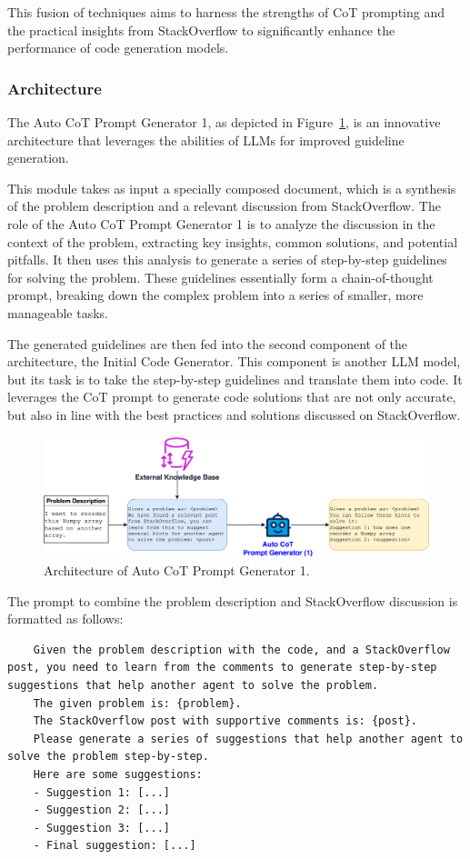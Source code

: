 \documentclass[a4paper,oneside]{book}
\begin{document}
This fusion of techniques aims to harness the strengths of CoT prompting and the practical insights from StackOverflow to significantly enhance the performance of code generation models.

\subsubsection{Architecture}
The Auto CoT Prompt Generator 1, as depicted in Figure~\ref{fig:cot_generator_1}, is an innovative architecture that leverages the abilities of LLMs for improved guideline generation.

This module takes as input a specially composed document, which is a synthesis of the problem description and a relevant discussion from StackOverflow. The role of the Auto CoT Prompt Generator 1 is to analyze the discussion in the context of the problem, extracting key insights, common solutions, and potential pitfalls. It then uses this analysis to generate a series of step-by-step guidelines for solving the problem. These guidelines essentially form a chain-of-thought prompt, breaking down the complex problem into a series of smaller, more manageable tasks.

The generated guidelines are then fed into the second component of the architecture, the Initial Code Generator. This component is another LLM model, but its task is to take the step-by-step guidelines and translate them into code. It leverages the CoT prompt to generate code solutions that are not only accurate, but also in line with the best practices and solutions discussed on StackOverflow.

\begin{figure}[H]
    \centering
    \includegraphics[width=1.0\textwidth]{img/cot_generator_1}
    \caption{Architecture of Auto CoT Prompt Generator 1.}\label{fig:cot_generator_1}
\end{figure}

The prompt to combine the problem description and StackOverflow discussion is formatted as follows:

\begin{lstlisting}
    Given the problem description with the code, and a StackOverflow post, you need to learn from the comments to generate step-by-step suggestions that help another agent to solve the problem.
    The given problem is: {problem}.
    The StackOverflow post with supportive comments is: {post}.
    Please generate a series of suggestions that help another agent to solve the problem step-by-step.
    Here are some suggestions:
    - Suggestion 1: [...]
    - Suggestion 2: [...]
    - Suggestion 3: [...]
    - Final suggestion: [...]
\end{lstlisting}
\end{document}
